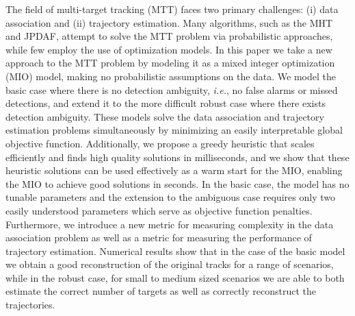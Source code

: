The field of multi-target tracking (MTT) faces two primary challenges: (i) data association and (ii) trajectory estimation. Many algorithms, such as the MHT and JPDAF, attempt to solve the MTT problem via probabilistic approaches, while few employ the use of optimization models. In this paper we take a new approach to the MTT problem by modeling it as a mixed integer optimization (MIO) model, making no probabilistic assumptions on the data. We model the basic case where there is no detection ambiguity, \textit{i.e.}, no false alarms or missed detections, and extend it to the more difficult robust case where there exists detection ambiguity. These models solve the data association and trajectory estimation problems simultaneously by minimizing an easily interpretable global objective function. Additionally, we propose a greedy heuristic that scales efficiently and finds high quality solutions in milliseconds, and we show that these heuristic solutions can be used effectively as a warm start for the MIO, enabling the MIO to achieve good solutions in seconds. In the basic case, the model has no tunable parameters and the extension to the ambiguous case requires only two easily understood parameters which serve as objective function penalties. Furthermore, we introduce a new metric for measuring complexity in the data association problem as well as a metric for measuring the performance of trajectory estimation. Numerical results show that in the case of the basic model we obtain a good reconstruction of the original tracks for a range of scenarios, while in the robust case, for small to medium sized scenarios we are able to both estimate the correct number of targets as well as correctly reconstruct the trajectories.
